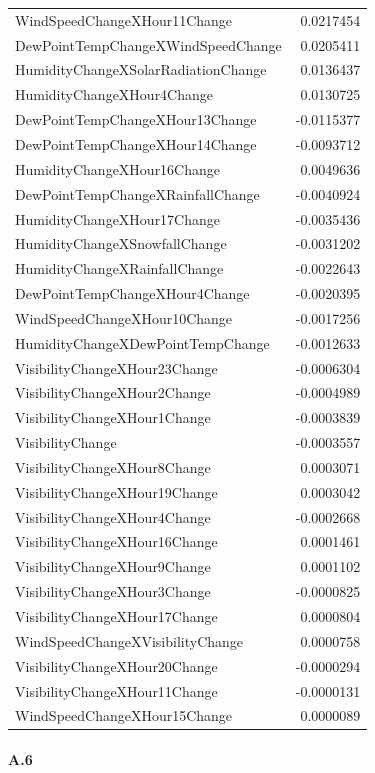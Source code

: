 \documentclass[
  letterpaper,
  DIV=11,
  numbers=noendperiod]{scrartcl}
\let\oldparagraph\paragraph
\renewcommand{\paragraph}[1]{\oldparagraph{#1}\mbox{}}
\begin{document}
\begin{longtable}[]{@{}lr@{}}
WindSpeedChangeXHour11Change & 0.0217454 \\
DewPointTempChangeXWindSpeedChange & 0.0205411 \\
HumidityChangeXSolarRadiationChange & 0.0136437 \\
HumidityChangeXHour4Change & 0.0130725 \\
DewPointTempChangeXHour13Change & -0.0115377 \\
DewPointTempChangeXHour14Change & -0.0093712 \\
HumidityChangeXHour16Change & 0.0049636 \\
DewPointTempChangeXRainfallChange & -0.0040924 \\
HumidityChangeXHour17Change & -0.0035436 \\
HumidityChangeXSnowfallChange & -0.0031202 \\
HumidityChangeXRainfallChange & -0.0022643 \\
DewPointTempChangeXHour4Change & -0.0020395 \\
WindSpeedChangeXHour10Change & -0.0017256 \\
HumidityChangeXDewPointTempChange & -0.0012633 \\
VisibilityChangeXHour23Change & -0.0006304 \\
VisibilityChangeXHour2Change & -0.0004989 \\
VisibilityChangeXHour1Change & -0.0003839 \\
VisibilityChange & -0.0003557 \\
VisibilityChangeXHour8Change & 0.0003071 \\
VisibilityChangeXHour19Change & 0.0003042 \\
VisibilityChangeXHour4Change & -0.0002668 \\
VisibilityChangeXHour16Change & 0.0001461 \\
VisibilityChangeXHour9Change & 0.0001102 \\
VisibilityChangeXHour3Change & -0.0000825 \\
VisibilityChangeXHour17Change & 0.0000804 \\
WindSpeedChangeXVisibilityChange & 0.0000758 \\
VisibilityChangeXHour20Change & -0.0000294 \\
VisibilityChangeXHour11Change & -0.0000131 \\
WindSpeedChangeXHour15Change & 0.0000089 \\
\end{longtable}

\hypertarget{a6}{%
\paragraph{A.6}\label{a6}}
\end{document}
